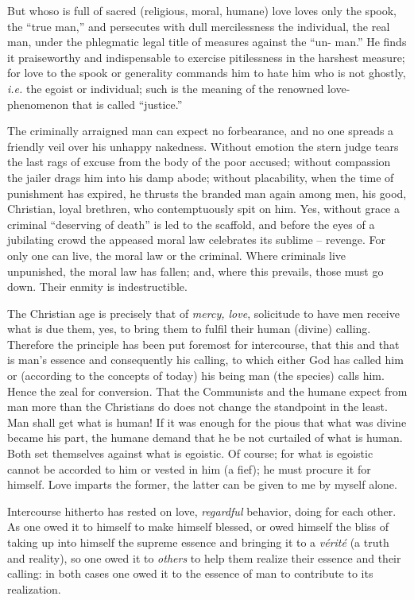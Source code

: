 \documentclass[12pt,a4paper]{book}
\begin{document}
But whoso is full of sacred (religious, moral, humane) love loves only the 
spook, the ``true man,'' and persecutes with dull mercilessness the 
individual, the real man, under the phlegmatic legal title of measures against 
the ``un- man.'' He finds it praiseworthy and indispensable to exercise 
pitilessness in the harshest measure; for love to the spook or generality 
commands him to hate him who is not ghostly, \textit{i.e.} the egoist or 
individual; such is the meaning of the renowned love-phenomenon that is called 
``justice.''

The criminally arraigned man can expect no forbearance, and no one spreads a 
friendly veil over his unhappy nakedness. Without emotion the stern judge 
tears the last rags of excuse from the body of the poor accused; without 
compassion the jailer drags him into his damp abode; without placability, when 
the time of punishment has expired, he thrusts the branded man again among 
men, his good, Christian, loyal brethren, who contemptuously spit on him. Yes, 
without grace a criminal ``deserving of death'' is led to the scaffold, and 
before the eyes of a jubilating crowd the appeased moral law celebrates its 
sublime -- revenge. For only one can live, the moral law or the criminal. 
Where criminals live unpunished, the moral law has fallen; and, where this 
prevails, those must go down. Their enmity is indestructible.

The Christian age is precisely that of \textit{mercy, love}, solicitude to 
have men receive what is due them, yes, to bring them to fulfil their human 
(divine) calling. Therefore the principle has been put foremost for 
intercourse, that this and that is man's essence and consequently his calling, 
to which either God has called him or (according to the concepts of today) his 
being man (the species) calls him. Hence the zeal for conversion. That the 
Communists and the humane expect from man more than the Christians do does not 
change the standpoint in the least. Man shall get what is human! If it was 
enough for the pious that what was divine became his part, the humane demand 
that he be not curtailed of what is human. Both set themselves against what is 
egoistic. Of course; for what is egoistic cannot be accorded to him or vested 
in him (a fief); he must procure it for himself. Love imparts the former, the 
latter can be given to me by myself alone.

Intercourse hitherto has rested on love, \textit{regardful} behavior, doing 
for each other. As one owed it to himself to make himself blessed, or owed 
himself the bliss of taking up into himself the supreme essence and bringing 
it to a \textit{v\'erit\'e} (a truth and reality), so one owed it to 
\textit{others} to help them realize their essence and their calling: in both 
cases one owed it to the essence of man to contribute to its realization.
\end{document}
